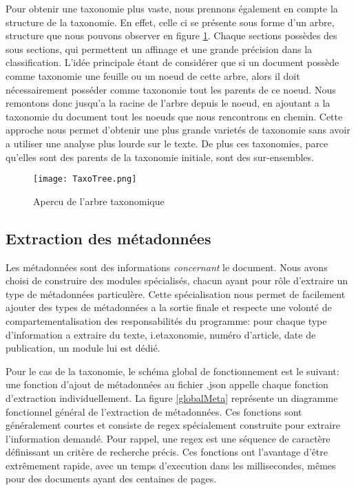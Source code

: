 Pour obtenir une taxonomie plus vaste, nous prennons également en compte la structure de la taxonomie.
En effet, celle ci se présente sous forme d'un arbre, structure que nous pouvons observer en figure \ref{fig:tree}.
Chaque sections possèdes des sous sections, qui permettent un affinage et une grande précision dans la classification.
L'idée principale étant de considérer que si un document possède comme taxonomie une feuille ou un noeud de cette arbre, alors il doit nécessairement posséder comme taxonomie tout les parents de ce noeud.
Nous remontons donc jusqu'a la racine de l'arbre depuis le noeud, en ajoutant a la taxonomie du document tout les noeuds que nous rencontrons en chemin.
Cette approche nous permet d'obtenir une plus grande varietés de taxonomie sans avoir a utiliser une analyse plus lourde sur le texte.
De plus ces taxonomies, parce qu'elles sont des parents de la taxonomie initiale, sont des sur-ensembles.
\begin{figure}[h!]
  \centering
  \texttt{[image: TaxoTree.png]}
	\caption[]{Apercu de l'arbre taxonomique}
  \label{fig:tree}
\end{figure}

\subsection{Extraction des métadonnées}
Les métadonnées sont des informations \textit{concernant} le document.
Nous avons choisi de construire des modules spécialisés, chacun ayant pour rôle d'extraire un type de métadonnées particulère.
Cette spécialisation nous permet de facilement ajouter des types de métadonnées a la sortie finale et respecte une volonté de compartementalisation des responsabilités du programme: pour chaque type d'information a extraire du texte, i.e\. taxonomie, numéro d'article, date de publication, un module lui est dédié. 

Pour le cas de la taxonomie, le schéma global de fonctionnement est le suivant: une fonction d'ajout de métadonnées au fichier .json appelle chaque fonction d'extraction individuellement.
La figure \ref{globalMeta} représente un diagramme fonctionnel général de l'extraction de métadonnées. Ces fonctions sont généralement courtes et consiste de regex spécialement construite pour extraire l'information demandé.
Pour rappel, une regex est une séquence de caractère définissant un critère de recherche précis.
Ces fonctions ont l'avantage d'être extrêmement rapide, avec un temps d'execution dans les millisecondes, mêmes pour des documents ayant des centaines de pages. 

